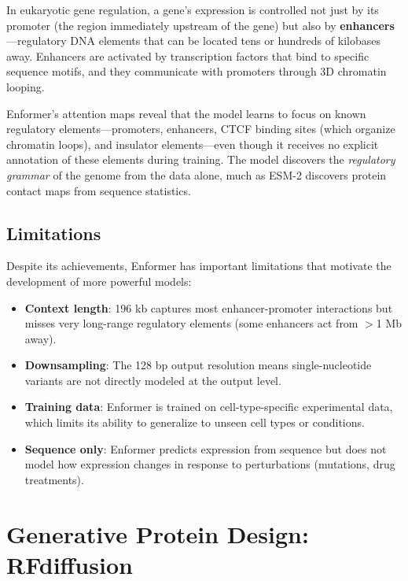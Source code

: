 In eukaryotic gene regulation, a gene's expression is controlled not just by its promoter (the region immediately upstream of the gene) but also by \textbf{enhancers}---regulatory DNA elements that can be located tens or hundreds of kilobases away. Enhancers are activated by transcription factors that bind to specific sequence motifs, and they communicate with promoters through 3D chromatin looping.

\begin{bioinsight}
Enformer's attention maps reveal that the model learns to focus on known regulatory elements---promoters, enhancers, CTCF binding sites (which organize chromatin loops), and insulator elements---even though it receives no explicit annotation of these elements during training. The model discovers the \emph{regulatory grammar} of the genome from the data alone, much as ESM-2 discovers protein contact maps from sequence statistics.
\end{bioinsight}

\subsection{Limitations}

Despite its achievements, Enformer has important limitations that motivate the development of more powerful models:
\begin{itemize}[leftmargin=1.5em]
  \item \textbf{Context length}: 196 kb captures most enhancer-promoter interactions but misses very long-range regulatory elements (some enhancers act from $>$1 Mb away).
  \item \textbf{Downsampling}: The 128 bp output resolution means single-nucleotide variants are not directly modeled at the output level.
  \item \textbf{Training data}: Enformer is trained on cell-type-specific experimental data, which limits its ability to generalize to unseen cell types or conditions.
  \item \textbf{Sequence only}: Enformer predicts expression from sequence but does not model how expression changes in response to perturbations (mutations, drug treatments).
\end{itemize}

\section{Generative Protein Design: RFdiffusion}
\label{sec:protein-design}

